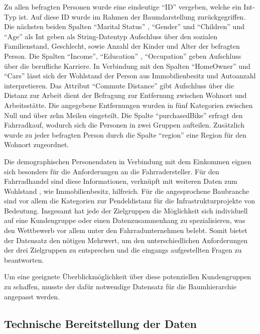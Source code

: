 \documentclass[usegeometry=true]{scrartcl}
\begin{document}
Zu allen befragten Personen wurde eine eindeutige "`ID"' vergeben, welche ein Int-Typ ist. Auf diese ID wurde im Rahmen der Baumdarstellung zurückgegriffen. 
 Die nächsten beiden Spalten "`Marital Status"' , "`Gender"' und "`Children"' und "`Age"' als Int geben als String-Datentyp Aufschluss über den sozialen  Familienstand, Geschlecht, sowie Anzahl der Kinder und Alter der befragten Person. Die Spalten "`Income"', "`Education"' , "`Occupation"' geben Aufschluss über die berufliche Karriere. In Verbindung mit den Spalten "`HomeOwner"' und "`Cars"' lässt sich der Wohlstand der Person aus Immobilienbesitz und Autoanzahl interpretieren. Das Attribut "`Commute Distance"' gibt Aufschluss über die Distanz zur Arbeit dient der Befragung zur Entfernung zwischen Wohnort und Arbeitsstätte. Die angegebene Entfernungen wurden in fünf Kategorien zwischen Null und über zehn Meilen eingeteilt. Die Spalte "`purchasedBike"' erfragt den Fahrradkauf, wodurch sich die Personen in zwei Gruppen aufteilen. Zusätzlich wurde zu jeder befragten Person durch die Spalte "`region"' eine Region für den Wohnort zugeordnet.

Die demographischen Personendaten in Verbindung mit dem Einkommen eignen sich besonders für die Anforderungen an die Fahrradersteller. Für den Fahrradhandel sind diese Informationen, verknüpft mit weiteren Daten zum Wohlstand , wie Immobilienbesitz, hilfreich. Für die angesprochene Baubranche sind vor allem die Kategorien zur Pendeldistanz für die Infrastrukturprojekte von Bedeutung. 
Insgesamt hat jede der Zielgruppen die Möglichkeit sich individuell auf eine Kundengruppe oder einen Datenzusammenhang zu spezialisieren, was den Wettbewerb vor allem unter den Fahrradunternehmen belebt. Somit bietet der Datensatz den nötigen Mehrwert, um den unterschiedlichen Anforderungen der drei Zielgruppen zu entsprechen und die eingangs aufgestellten Fragen zu beantworten.
 
Um eine geeignete Überblickmöglichkeit über diese potenziellen Kundengruppen zu schaffen, musste der dafür notwendige Datensatz für die Baumhierarchie angepasst werden. 

\subsection{Technische Bereitstellung der Daten}
\end{document}
